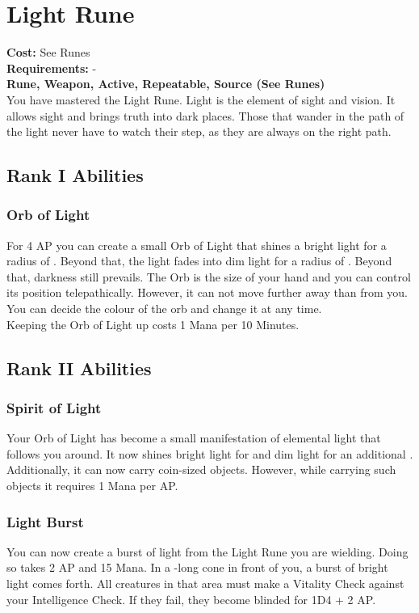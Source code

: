 \section{Light Rune}\label{rune:light}
\textbf{Cost:} See Runes\\
\textbf{Requirements:} -\\
\textbf{Rune, Weapon, Active, Repeatable, Source (See Runes)}\\
You have mastered the Light Rune.
Light is the element of sight and vision.
It allows sight and brings truth into dark places. Those that wander in the path of the light never have to watch their step, as they are always on the right path.
\subsection{Rank I Abilities}

\subsubsection{Orb of Light}
For 4 AP you can create a small Orb of Light that shines a bright light for a radius of .
Beyond that, the light fades into dim light for a radius of .
Beyond that, darkness still prevails.
The Orb is the size of your hand and you can control its position telepathically.
However, it can not move further away than  from you.
You can decide the colour of the orb and change it at any time. \\
Keeping the Orb of Light up costs 1 Mana per 10 Minutes.


\subsection{Rank II Abilities}

\subsubsection{Spirit of Light}
Your Orb of Light has become a small manifestation of elemental light that follows you around.
It now shines bright light for  and dim light for an additional .\\
Additionally, it can now carry coin-sized objects.
However, while carrying such objects it requires 1 Mana per AP.

\subsubsection{Light Burst}
You can now create a burst of light from the Light Rune you are wielding.
Doing so takes 2 AP and 15 Mana.
In a -long cone in front of you, a burst of bright light comes forth.
All creatures in that area must make a Vitality Check against your Intelligence Check.
If they fail, they become blinded for 1D4 + 2 AP.

